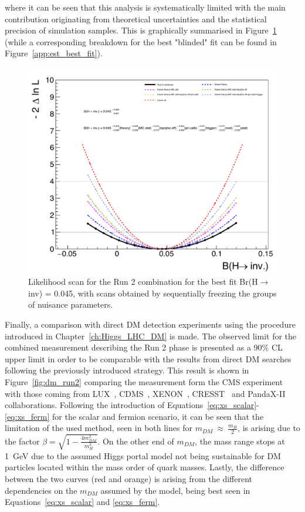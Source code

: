 where it can be seen that this analysis is systematically limited with the main contribution originating from theoretical uncertainties and the statistical precision of simulation samples. This is graphically summarised in Figure~\ref{app:obs_best_fit} (while a corresponding breakdown for the best "blinded" fit can be found in Figure~\ref{app:est_best_fit}).
\begin{figure}[htbp]
  \centering
   \includegraphics[width=\textwidth]{FIt_structure/breakdown.pdf}
   
  \caption{Likelihood scan for the Run 2 combination for the best fit Br(H$\rightarrow$inv) = 0.045, with scans obtained by sequentially freezing the groups of nuisance parameters.}
  \label{app:obs_best_fit}
\end{figure}

\newpage
\hspace{10pt} Finally, a comparison with direct DM detection experiments using the procedure introduced in Chapter~\ref{ch:Higgs_LHC_DM} is made. The observed limit for the combined measurement describing the Run 2 phase is presented as a 90\% CL upper limit in order to be comparable with the results from direct DM searches following the previously introduced strategy. This result is shown in Figure~\ref{fig:dm_run2} comparing the measurement form the CMS experiment with those coming from LUX~\cite{DM:lux}, CDMS~\cite{DM:cdsmlite}, XENON~\cite{DM:xenon1,DM:xenon2}, CRESST~\cite{DM:cresst} and PandaX-II~\cite{DM:panda} collaborations. Following the introduction of Equations~\ref{eq:xs_scalar}-\ref{eq:xs_ferm} for the scalar and fermion scenario, it can be seen that the limitation of the used method, seen in both lines for $m_{DM}~\approx~\frac{m_{H}}{2}$, is arising due to the factor $\beta = \sqrt{1-\frac{4m_{DM}^2}{m_{H}^2}}$. On the other end of $m_{DM}$, the mass range stops at 1~GeV due to the assumed Higgs portal model not being sustainable for DM particles located within the mass order of quark masses. Lastly, the difference between the two curves (red and orange) is arising from the different dependencies on the $m_{DM}$ assumed by the model, being best seen in Equations~\ref{eq:xs_scalar} and \ref{eq:xs_ferm}.



